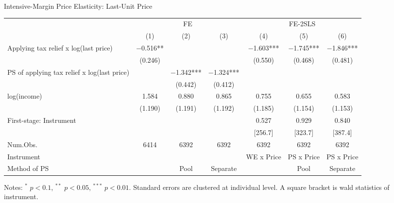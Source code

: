 \documentclass[
  ignorenonframetext,
  aspectratio=169,
]{beamer}
\begin{document}
\begin{frame}{Intensive-Margin Price Elasticity: Last-Unit Price}
\protect\hypertarget{intensive-margin-price-elasticity-last-unit-price}{}
\begin{table}[!h]
\centering
\fontsize{8}{10}\selectfont
\begin{threeparttable}
\begin{tabular}[t]{>{\raggedright\arraybackslash}p{10em}cccccc}
\toprule
\multicolumn{1}{c}{ } & \multicolumn{3}{c}{FE} & \multicolumn{3}{c}{FE-2SLS} \\
\cmidrule(l{3pt}r{3pt}){2-4} \cmidrule(l{3pt}r{3pt}){5-7}
  & (1) & (2) & (3) & (4) & (5) & (6)\\
\midrule
Applying tax relief x log(last price) & \num{-0.516}** &  &  & \num{-1.603}*** & \num{-1.745}*** & \num{-1.846}***\\
 & (\num{0.246}) &  &  & (\num{0.550}) & (\num{0.468}) & (\num{0.481})\\
PS of applying tax relief x log(last price) &  & \num{-1.342}*** & \num{-1.324}*** &  &  & \\
 &  & (\num{0.442}) & (\num{0.412}) &  &  & \\
log(income) & \num{1.584} & \num{0.880} & \num{0.865} & \num{0.755} & \num{0.655} & \num{0.583}\\
 & (\num{1.190}) & (\num{1.191}) & (\num{1.192}) & (\num{1.185}) & (\num{1.154}) & (\num{1.153})\\
\midrule
First-stage: Instrument &  &  &  & 0.527 & 0.929 & 0.840\\
 &  &  &  & {}[256.7] & {}[323.7] & {}[387.4]\\
Num.Obs. & \num{6414} & \num{6392} & \num{6392} & \num{6392} & \num{6392} & \num{6392}\\
Instrument &  &  &  & WE x Price & PS x Price & PS x Price\\
Method of PS &  & Pool & Separate &  & Pool & Separate\\
\bottomrule
\end{tabular}
\begin{tablenotes}
\item Notes: $^{*}$ $p < 0.1$, $^{**}$ $p < 0.05$, $^{***}$ $p < 0.01$. Standard errors are clustered at individual level. A square bracket is wald statistics of instrument.
\end{tablenotes}
\end{threeparttable}
\end{table}
\end{frame}
\end{document}

